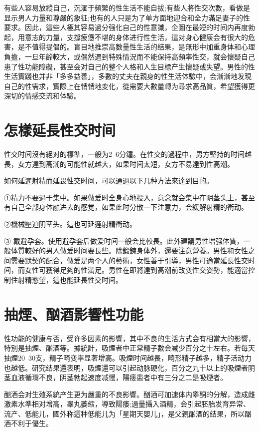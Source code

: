 \documentclass[12pt,UTF8]{ctexbook}
\begin{document}
有些人容易放縱自己，沉湎于頻繁的性生活不能自拔;有些人將性交次數，看做是显示男人力量和尊嚴的象征;也有的人只是为了单方面地迎合和全力滿足妻子的性要求。因此，這些人極其容易過分强化自己的性意識，企圖在最短的时间内再度勃起，用意志的力量，支撐疲憊不堪的身体进行性生活，這对身心健康会有很大的危害，是不值得提倡的。盲目地推崇高數量性生活的结果，是無形中加重身体和心理負擔，一旦年齡較大，或偶然遇到特殊情況而不能保持高頻率性交，就会懷疑自己患了性功能障礙，甚至会对自己的整个人格和人生目標产生懷疑或失望。男性的性生活實踐也并非「多多益善」，多數的丈夫在親身的性生活体驗中，会漸漸地发現自己的性需求，實際上在悄悄地变化，從需要大數量轉为尋求高品質，希望獲得更深切的情感交流和体驗。

\section{怎樣延長性交时间}

性交时间沒有絕对的標準，一般为2~6分鐘。在性交的過程中，男方堅持的时间越長，女方達到高潮的可能性就越大，如果时间太短，女方不易達到性高潮。

如何延遲射精而延畏性交时间，可以通過以下几种方法來達到目的。

①精力不要過于集中。如果做爱时全身心地投入，意念就会集中在阴茎头上，甚至有自己全部身体融进去的感觉，如果此时分散一下注意力，会緩解射精的衝动。

②機械壓迫阴茎头。這也可延遲射精衝动。

③ 戴避孕套。使用避孕套后做爱时间一般会比較長。此外建議男性增强体質，一般体質較好的男人做爱时间要長些。除鍛鍊身体外，還要注意營養。男性和女性之间需要默契的配合，做爱是两个人的藝術，女性善于引導，男性可適當延長性交时间，而女性可獲得足夠的性滿足。男性在即將達到高潮前改变性交姿勢，能適當控制住射精慾望，這也能延長性交时间。

\section{抽煙、酗酒影響性功能}

性功能的健康与否，受许多因素的影響，其中不良的生活方式会有相當大的影響，特別是抽煙、酗酒等。據統計，吸煙者中正常精子數会减少百分之十左右。若每天抽煙20~30支，精子畸变率显著增高。吸煙时间越長，畸形精子越多，精子活动力也越低。研究结果還表明，吸煙還可以引起动脉硬化，百分之九十以上的吸煙者阴茎血液循環不良，阴茎勃起速度减慢，陽痿患者中有三分之二是吸煙者。

酗酒会对生殖系統产生更为嚴重的不良影響。酗酒可加速体内睾酮的分解，造成雌激素水準相对增高，睾丸萎缩，導致陽痿;過量攝入酒精，会引起胚胎发育异常、流产、低能儿，國外称這种低能儿为「星期天嬰儿」，是父親酗酒的结果，所以酗酒不利于優生。
\end{document}
